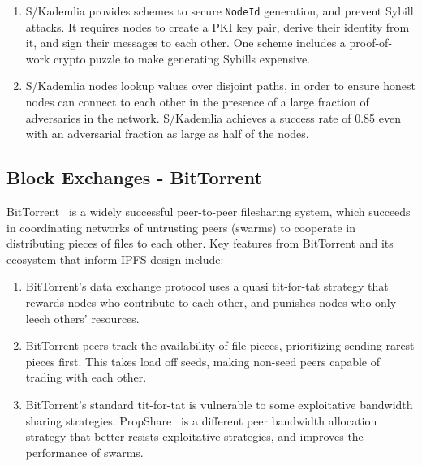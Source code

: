 \documentclass{sig-alternate}
\begin{document}
\begin{enumerate}

  \item S/Kademlia provides schemes to secure \texttt{NodeId} generation,
        and prevent Sybill attacks. It requires nodes to create a PKI key pair, derive their identity from it, and sign their messages to each other. One scheme includes a proof-of-work crypto puzzle to make generating Sybills expensive.

  \item S/Kademlia nodes lookup values over disjoint paths, in order to
        ensure honest nodes can connect to each other in the presence of a large fraction of adversaries in the network. S/Kademlia achieves a success rate of 0.85 even with an adversarial fraction as large as half of the nodes.

\end{enumerate}

\subsection{Block Exchanges - BitTorrent}

BitTorrent~\cite{cohen03} is a widely successful peer-to-peer filesharing system, which succeeds in coordinating networks of untrusting peers (swarms) to cooperate in distributing pieces of files to each other. Key features from BitTorrent and its ecosystem that inform IPFS design include:

\begin{enumerate}
  \item BitTorrent's data exchange protocol uses a quasi tit-for-tat strategy
        that rewards nodes who contribute to each other, and punishes nodes who only leech others' resources.

  \item BitTorrent peers track the availability of file pieces, prioritizing
        sending rarest pieces first. This takes load off seeds, making non-seed peers capable of trading with each other.

  \item BitTorrent's standard tit-for-tat is vulnerable to some exploitative
        bandwidth sharing strategies. PropShare~\cite{levin08} is a different peer bandwidth allocation strategy that better resists exploitative strategies, and improves the performance of swarms.

\end{enumerate}
\end{document}
